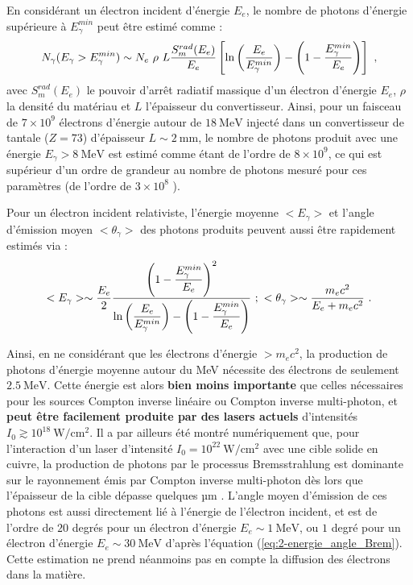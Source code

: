 \begin{refsection}
En considérant un électron incident d'énergie $E_e$, le nombre de photons d'énergie supérieure à $E_\gamma^{min}$ peut être estimé comme \parencite{carron_2007} :
\begin{equation}
    N_\gamma(E_\gamma>E_\gamma^{min}) \sim N_e ~ \rho ~ L \dfrac{S_m^{rad}(E_e)}{E_e} \left[\ln\left(\dfrac{E_e}{E_\gamma^{min}}\right) - \left(1-\dfrac{E_\gamma^{min}}{E_e}\right)\right] ~ \rm ,
\end{equation}
avec $S_m^{rad}(E_e)$ le pouvoir d'arrêt radiatif massique d'un électron d'énergie $E_e$, $\rho$ la densité du matériau et $L$ l'épaisseur du convertisseur. Ainsi, pour un faisceau de $7 \times 10^9$ électrons d'énergie autour de $18 ~ \si{\MeV}$ injecté dans un convertisseur de tantale ($Z=73$) d'épaisseur $L \sim 2~ \si{\mm}$, le nombre de photons produit avec une énergie $E_\gamma>8 ~ \si{\MeV}$ est estimé comme étant de l'ordre de $8 \times 10^9$, ce qui est supérieur d'un ordre de grandeur au nombre de photons mesuré pour ces paramètres (de l'ordre de $3 \times 10^8$ \parencite{giulietti_2008}).

Pour un électron incident relativiste, l'énergie moyenne $<E_\gamma>$ et l'angle d'émission moyen $<\theta_\gamma>$ des photons produits peuvent aussi être rapidement estimés via \parencite{carron_2007} :
\begin{equation}
    <E_\gamma> \sim \dfrac{E_e}{2} \dfrac{\left(1-\dfrac{E_\gamma^{min}}{E_e}\right)^2}{\ln\left(\dfrac{E_e}{E_\gamma^{min}}\right)-\left(1-\dfrac{E_\gamma^{min}}{E_e}\right)} ~ ; ~
    <\theta_\gamma> \sim \dfrac{m_e c^2}{E_e + m_e c^2} ~ \rm .
    \label{eq:2-energie_angle_Brem}
\end{equation}

Ainsi, en ne considérant que les électrons d'énergie $>m_e c^2$, la production de photons d'énergie moyenne autour du MeV nécessite des électrons de seulement $2.5 ~ \si{\MeV}$. Cette énergie est alors \textbf{bien moins importante} que celles nécessaires pour les sources Compton inverse linéaire ou Compton inverse multi-photon, et \textbf{peut être facilement produite par des lasers actuels} d'intensités $I_0 \gtrsim 10^{18} ~ \si{\W \per\cm^2}$. Il a par ailleurs été montré numériquement que, pour l'interaction d'un laser d'intensité $I_0=10^{22} ~ \si{\W\per\cm^2}$ avec une cible solide en cuivre, la production de photons par le processus Bremsstrahlung est dominante sur le rayonnement émis par Compton inverse multi-photon dès lors que l'épaisseur de la cible dépasse quelques µm \parencite{martinez_2020}. L'angle moyen d'émission de ces photons est aussi directement lié à l'énergie de l'électron incident, et est de l'ordre de $20$ degrés pour un électron d'énergie $E_e \sim 1 ~ \si{\MeV}$, ou $1$ degré pour un électron d'énergie $E_e \sim 30 ~ \si{\MeV}$ d'après l'équation (\ref{eq:2-energie_angle_Brem}). Cette estimation ne prend néanmoins pas en compte la diffusion des électrons dans la matière.


\end{refsection}
